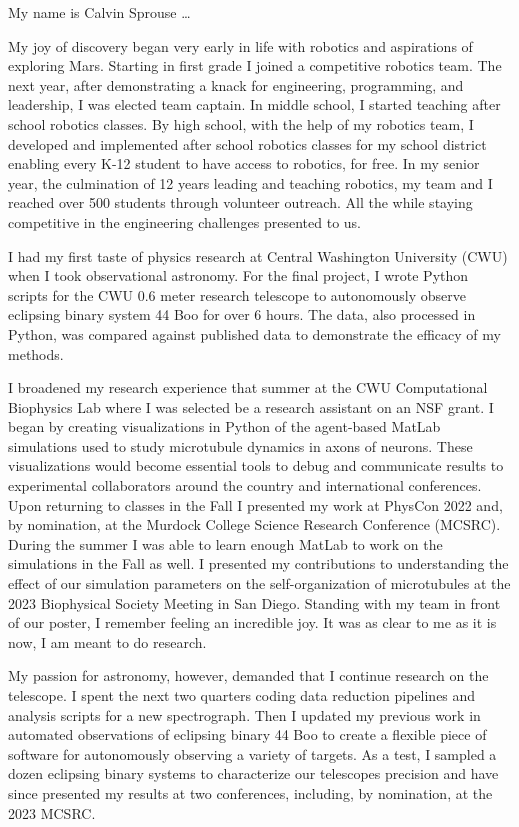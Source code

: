 \documentclass[a4paper, 12pt]{article}
\begin{document}
My name is Calvin Sprouse \dots

My joy of discovery began very early in life with robotics and aspirations of exploring Mars. Starting in first grade I joined a competitive robotics team. The next year, after demonstrating a knack for engineering, programming, and leadership, I was elected team captain. In middle school, I started teaching after school robotics classes. By high school, with the help of my robotics team, I developed and implemented after school robotics classes for my school district enabling every K-12 student to have access to robotics, for free. In my senior year, the culmination of 12 years leading and teaching robotics, my team and I reached over 500 students through volunteer outreach. All the while staying competitive in the engineering challenges presented to us.

I had my first taste of physics research at Central Washington University (CWU) when I took observational astronomy. For the final project, I wrote Python scripts for the CWU 0.6 meter research telescope to autonomously observe eclipsing binary system 44 Boo for over 6 hours. The data, also processed in Python, was compared against published data to demonstrate the efficacy of my methods.

I broadened my research experience that summer at the CWU Computational Biophysics Lab where I was selected be a research assistant on an NSF grant. I began by creating visualizations in Python of the agent-based MatLab simulations used to study microtubule dynamics in axons of neurons. These visualizations would become essential tools to debug and communicate results to experimental collaborators around the country and international conferences. Upon returning to classes in the Fall I presented my work at PhysCon 2022 and, by nomination, at the Murdock College Science Research Conference (MCSRC). During the summer I was able to learn enough MatLab to work on the simulations in the Fall as well. I presented my contributions to understanding the effect of our simulation parameters on the self-organization of microtubules at the 2023 Biophysical Society Meeting in San Diego. Standing with my team in front of our poster, I remember feeling an incredible joy. It was as clear to me as it is now, I am meant to do research.

My passion for astronomy, however, demanded that I continue research on the telescope. I spent the next two quarters coding data reduction pipelines and  analysis scripts for a new spectrograph. Then I updated my previous work in automated observations of eclipsing binary 44 Boo to create a flexible piece of software for autonomously observing a variety of targets. As a test, I sampled a dozen eclipsing binary systems to characterize our telescopes precision and have since presented my results at two conferences, including, by nomination, at the 2023 MCSRC.
\end{document}
